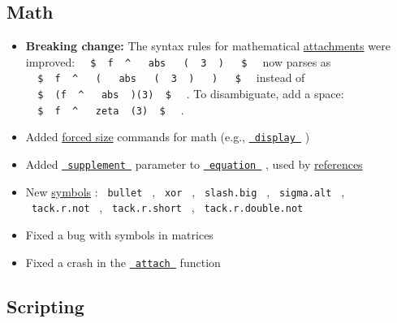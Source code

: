 \subsection{Math}\label{math}

\begin{itemize}
\tightlist
\item
  \textbf{Breaking change:} The syntax rules for mathematical
  \href{/docs/reference/math/attach/\#functions-attach}{attachments}
  were improved:
  \texttt{\ }{\texttt{\ \$\ }}\texttt{\ f\ }{\texttt{\ \^{}\ }}\texttt{\ }{\texttt{\ abs\ }}\texttt{\ }{\texttt{\ (\ }}\texttt{\ 3\ }{\texttt{\ )\ }}\texttt{\ }{\texttt{\ \$\ }}\texttt{\ }
  now parses as
  \texttt{\ }{\texttt{\ \$\ }}\texttt{\ f\ }{\texttt{\ \^{}\ }}\texttt{\ }{\texttt{\ (\ }}\texttt{\ }{\texttt{\ abs\ }}\texttt{\ }{\texttt{\ (\ }}\texttt{\ 3\ }{\texttt{\ )\ }}\texttt{\ }{\texttt{\ )\ }}\texttt{\ }{\texttt{\ \$\ }}\texttt{\ }
  instead of
  \texttt{\ }{\texttt{\ \$\ }}\texttt{\ (f\ }{\texttt{\ \^{}\ }}\texttt{\ }{\texttt{\ abs\ }}\texttt{\ )(3)\ }{\texttt{\ \$\ }}\texttt{\ }
  . To disambiguate, add a space:
  \texttt{\ }{\texttt{\ \$\ }}\texttt{\ f\ }{\texttt{\ \^{}\ }}\texttt{\ }{\texttt{\ zeta\ }}\texttt{\ (3)\ }{\texttt{\ \$\ }}\texttt{\ }
  .
\item
  Added \href{/docs/reference/math/sizes/}{forced size} commands for
  math (e.g.,
  \href{/docs/reference/math/sizes/\#functions-display}{\texttt{\ display\ }}
  )
\item
  Added
  \href{/docs/reference/math/equation/\#parameters-supplement}{\texttt{\ supplement\ }}
  parameter to
  \href{/docs/reference/math/equation/}{\texttt{\ equation\ }} , used by
  \href{/docs/reference/model/ref/}{references}
\item
  New \href{/docs/reference/symbols/sym/}{symbols} : \texttt{\ bullet\ }
  , \texttt{\ xor\ } , \texttt{\ slash.big\ } , \texttt{\ sigma.alt\ } ,
  \texttt{\ tack.r.not\ } , \texttt{\ tack.r.short\ } ,
  \texttt{\ tack.r.double.not\ }
\item
  Fixed a bug with symbols in matrices
\item
  Fixed a crash in the
  \href{/docs/reference/math/attach/\#functions-attach}{\texttt{\ attach\ }}
  function
\end{itemize}

\subsection{Scripting}\label{scripting}


